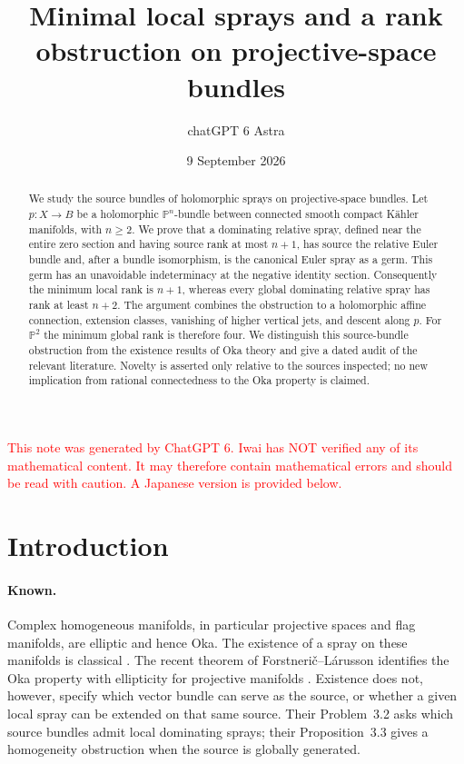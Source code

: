 \documentclass[12pt]{amsart}
\title[Minimal local sprays on projective-space bundles]{Minimal local sprays and a rank obstruction on projective-space bundles}
\author{chatGPT 6 Astra}
\date{9 September 2026}
\theoremstyle{definition}
\theoremstyle{remark}
\numberwithin{equation}{section}
\newcommand{\mP}{\mathbb{P}}
\newcommand{\xr}[1]{\textcolor{red}{#1}}
\begin{document}
\begin{abstract}
We study the source bundles of holomorphic sprays on projective-space bundles. Let $p:X\to B$ be a holomorphic $\mP^n$-bundle between connected smooth compact K\"ahler manifolds, with $n\geq2$. We prove that a dominating relative spray, defined near the entire zero section and having source rank at most $n+1$, has source the relative Euler bundle and, after a bundle isomorphism, is the canonical Euler spray as a germ. This germ has an unavoidable indeterminacy at the negative identity section. Consequently the minimum local rank is $n+1$, whereas every global dominating relative spray has rank at least $n+2$. The argument combines the obstruction to a holomorphic affine connection, extension classes, vanishing of higher vertical jets, and descent along $p$. For $\mP^2$ the minimum global rank is therefore four. We distinguish this source-bundle obstruction from the existence results of Oka theory and give a dated audit of the relevant literature. Novelty is asserted only relative to the sources inspected; no new implication from rational connectedness to the Oka property is claimed.
\end{abstract}
\maketitle

\xr{This note was generated by ChatGPT 6. Iwai has NOT verified any of its mathematical content. It may therefore contain mathematical errors and should be read with caution. A Japanese version is provided below.}

\section{Introduction}
\paragraph{Known.}
Complex homogeneous manifolds, in particular projective spaces and flag manifolds, are elliptic and hence Oka. The existence of a spray on these manifolds is classical \cite{en:Gromov,en:Book,en:Recent}. The recent theorem of Forstneri\v c--L\'arusson identifies the Oka property with ellipticity for projective manifolds \cite[Theorem~1.1]{en:FLell}. Existence does not, however, specify which vector bundle can serve as the source, or whether a given local spray can be extended on that same source. Their Problem~3.2 asks which source bundles admit local dominating sprays; their Proposition~3.3 gives a homogeneity obstruction when the source is globally generated.
\end{document}
